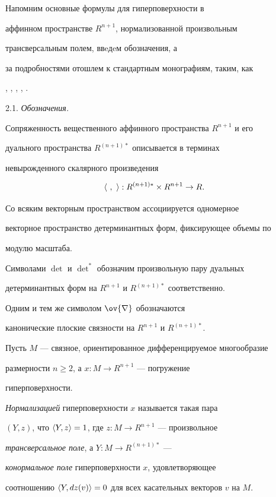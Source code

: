 Напомним основные формулы для гиперповерхности в


аффинном пространстве $R^{n+1}$, нормализованной произвольным


трансверсальным полем, ввeдeм обозначения, а


за подробностями отошлем к стандартным монографиям, таким, как


\cite{BLA}, \cite{SCHI}, \cite{LI-S-Z-1}, \cite{NOM-SA}, \cite{SIM-S-V}.


\medskip





2.1. {\it Обозначения.}


Сопряженность вещественного аффинного пространства $ R^{n+1}$ и его


дуального пространства $R^{(n+1)*}$ описывается в терминах


невырожденного скалярного произведения


$$


\la\ ,\ \ra: R^{(n+1)*} \times R^{n+1} \to R.


$$


Со всяким векторным пространством ассоциируется одномерное


векторное пространство детерминантных форм, фиксирующее объемы по


модулю масштаба.


Символами $\det$ и $\det^*$ обозначим произвольную пару дуальных


детерминантных форм на $R^{n+1}$ и $R^{(n+1)*}$ соответственно.


Одним и тем же символом $\ov{\nabla}$ обозначаются


канонические плоские связности на $R^{n+1}$ и $R^{(n+1)*}$.


Пусть $M$ --- связное, ориентированное дифференцируемое многообразие


размерности $n \geq 2$, а $x:M \to R^{n+1}$ --- погружение


гиперповерхности.


{\it Нормализацией} гиперповерхности $x$ называется такая пара


$(Y,z)$, что $\langle Y,z\rangle=1$, где $z:M \to R^{n+1}$ --- произвольное


{\it трансверсальное поле}, а $Y:M \to R^{(n+1)*}$ ---


{\it конормальное поле} гиперповерхности $x$, удовлетворяющее


соотношению $\langle Y,dz(v)\rangle=0$ для всех касательных векторов $v$ на $M$.


